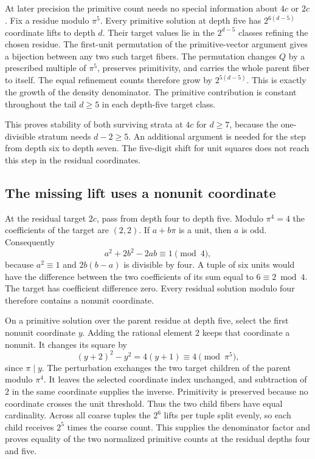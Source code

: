 \documentclass[12pt,letterpaper]{article}
\begin{document}
At later precision the primitive count needs no special information about $4c$ or $2c$. Fix a residue modulo $\pi^5$. Every primitive solution at depth five has $2^{6(d-5)}$ coordinate lifts to depth $d$. Their target values lie in the $2^{d-5}$ classes refining the chosen residue. The first-unit permutation of the primitive-vector argument gives a bijection between any two such target fibers. The permutation changes $Q$ by a prescribed multiple of $\pi^5$, preserves primitivity, and carries the whole parent fiber to itself. The equal refinement counts therefore grow by $2^{5(d-5)}$. This is exactly the growth of the density denominator. The primitive contribution is constant throughout the tail $d\geq 5$ in each depth-five target class.

This proves stability of both surviving strata at $4c$ for $d\geq 7$, because the one-divisible stratum needs $d-2\geq 5$. An additional argument is needed for the step from depth six to depth seven. The five-digit shift for unit squares does not reach this step in the residual coordinates.

\subsection{The missing lift uses a nonunit coordinate}
At the residual target $2c$, pass from depth four to depth five. Modulo $\pi^4=4$ the coefficients of the target are $(2,2)$. If $a+b\pi$ is a unit, then $a$ is odd. Consequently
\[
 a^2+2b^2-2ab\equiv 1\pmod{4},
\]
because $a^2\equiv 1$ and $2b(b-a)$ is divisible by four. A tuple of six units would have the difference between the two coefficients of its sum equal to $6\equiv 2\bmod 4$. The target has coefficient difference zero. Every residual solution modulo four therefore contains a nonunit coordinate.

On a primitive solution over the parent residue at depth five, select the first nonunit coordinate $y$. Adding the rational element $2$ keeps that coordinate a nonunit. It changes its square by
\[
 (y+2)^2-y^2=4(y+1)\equiv 4\pmod{\pi^5},
\]
since $\pi\mid y$. The perturbation exchanges the two target children of the parent modulo $\pi^4$. It leaves the selected coordinate index unchanged, and subtraction of $2$ in the same coordinate supplies the inverse. Primitivity is preserved because no coordinate crosses the unit threshold. Thus the two child fibers have equal cardinality. Across all coarse tuples the $2^6$ lifts per tuple split evenly, so each child receives $2^5$ times the coarse count. This supplies the denominator factor and proves equality of the two normalized primitive counts at the residual depths four and five.
\end{document}
